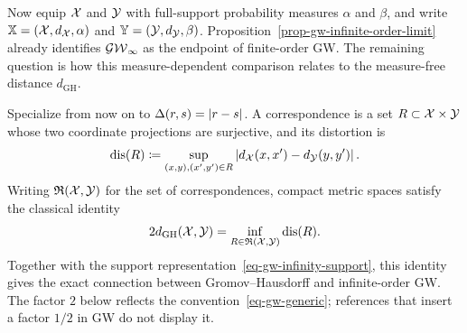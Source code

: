 Now equip $\mathcal{X}$ and $\mathcal{Y}$ with full-support probability measures $\alpha$ and $\beta$, and write $\mathbb{X}=(\mathcal{X},d_{\mathcal{X}},\alpha)$ and $\mathbb{Y}=(\mathcal{Y},d_{\mathcal{Y}},\beta)$. Proposition~\ref{prop-gw-infinite-order-limit} already identifies $\operatorname{\mathcal{GW}}_\infty$ as the endpoint of finite-order GW\@. The remaining question is how this measure-dependent comparison relates to the measure-free distance $d_{\mathrm{GH}}$.

Specialize from now on to $\Delta(r,s)=|r-s|$. A correspondence is a set $R\subset\mathcal{X}\times\mathcal{Y}$ whose two coordinate projections are surjective, and its distortion is
\[
	\operatorname{dis}(R)
	\coloneqq
	\sup_{(x,y),(x',y')\in R}
	\left\lvert d_{\mathcal{X}}(x,x')-d_{\mathcal{Y}}(y,y')\right\rvert.
\]
Writing $\mathfrak R(\mathcal{X},\mathcal{Y})$ for the set of correspondences, compact metric spaces satisfy the classical identity~\cite{gromov-2001,burago2001course,memoli-2007}
\begin{equation}\label{eq-gh-correspondence-distortion}
	2d_{\mathrm{GH}}(\mathcal{X},\mathcal{Y})
	=
	\inf_{R\in\mathfrak R(\mathcal{X},\mathcal{Y})}\operatorname{dis}(R).
\end{equation}
Together with the support representation~\eqref{eq-gw-infinity-support}, this identity gives the exact connection between Gromov--Hausdorff and infinite-order GW\@. The factor $2$ below reflects the convention~\eqref{eq-gw-generic}; references that insert a factor $1/2$ in GW do not display it.

